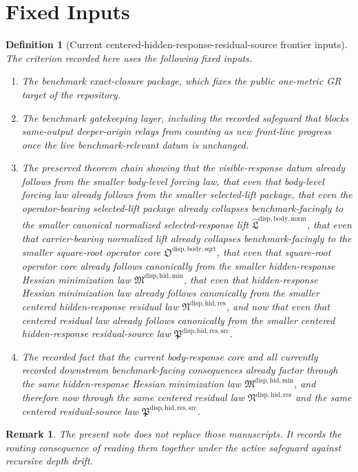 \documentclass[11pt]{article}
\newcommand{\ResidualSourceLawPackage}{\mathfrak P^{\mathrm{disp,hid,res,src}}}
\newcommand{\ResidualLawPackage}{\mathfrak N^{\mathrm{disp,hid,res}}}
\newcommand{\HiddenMinimizationPackage}{\mathfrak M^{\mathrm{disp,hid,min}}}
\newcommand{\SquareRootOperatorCore}{\mathfrak O^{\mathrm{disp,body,sqrt}}}
\newcommand{\NormalizedLiftPackage}{\widehat{\mathfrak L}^{\mathrm{disp,body,norm}}}
\newtheorem{definition}{Definition}
\newtheorem{remark}{Remark}
\begin{document}
\section{Fixed Inputs}

\begin{definition}[Current centered-hidden-response-residual-source frontier inputs]
The criterion recorded here uses the following fixed inputs.
\begin{enumerate}
    \item The benchmark exact-closure package, which fixes the public one-metric GR target of the repository.
    \item The benchmark gatekeeping layer, including the recorded safeguard that blocks same-output deeper-origin relays from counting as new front-line progress once the live benchmark-relevant datum is unchanged.
    \item The preserved theorem chain showing that the visible-response datum already follows from the smaller body-level forcing law, that even that body-level forcing law already follows from the smaller selected-lift package, that even the operator-bearing selected-lift package already collapses benchmark-facingly to the smaller canonical normalized selected-response lift \(\NormalizedLiftPackage\), that even that carrier-bearing normalized lift already collapses benchmark-facingly to the smaller square-root operator core \(\SquareRootOperatorCore\), that even that square-root operator core already follows canonically from the smaller hidden-response Hessian minimization law \(\HiddenMinimizationPackage\), that even that hidden-response Hessian minimization law already follows canonically from the smaller centered hidden-response residual law \(\ResidualLawPackage\), and now that even that centered residual law already follows canonically from the smaller centered hidden-response residual-source law \(\ResidualSourceLawPackage\).
    \item The recorded fact that the current body-response core and all currently recorded downstream benchmark-facing consequences already factor through the same hidden-response Hessian minimization law \(\HiddenMinimizationPackage\), and therefore now through the same centered residual law \(\ResidualLawPackage\) and the same centered residual-source law \(\ResidualSourceLawPackage\).
\end{enumerate}
\end{definition}

\begin{remark}
The present note does not replace those manuscripts. It records the routing consequence of reading them together under the active safeguard against recursive depth drift.
\end{remark}
\end{document}
